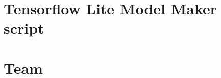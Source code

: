 \documentclass[
oneside    %
]{USN-BSc}
\begin{document}
\chapter{Tensorflow Lite Model Maker script}
\label{appendix:ModelMaker}


\chapter{Team}
\label{appendix:teaminfo}






%
%







\end{document}
